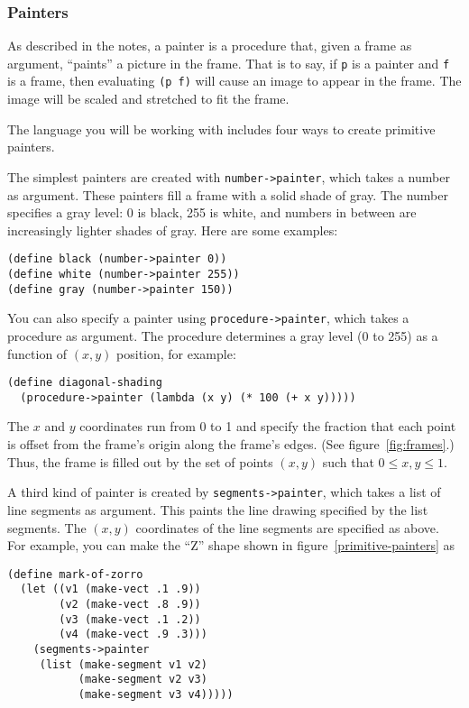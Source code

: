\subsubsection{Painters}

As described in the notes, a painter is a procedure that, given a frame
as argument, ``paints'' a picture in the frame.  That is to say, if
{\tt p} is a painter and {\tt f} is a frame, then evaluating {\tt (p
f)} will cause an image to appear in the frame.  The image will be
scaled and stretched to fit the frame.

The language you will be working with includes four ways to create
primitive painters.

The simplest painters are created with {\tt number->painter}, which
takes a number as argument.  These painters fill a frame with a solid
shade of gray.  The number specifies a gray level: 0 is black, 255 is
white, and numbers in between are increasingly lighter shades of
gray.  Here are some examples:

\begin{verbatim}
(define black (number->painter 0))
(define white (number->painter 255))
(define gray (number->painter 150))
\end{verbatim}

\noindent
You can also specify a painter using {\tt procedure->painter}, which
takes a procedure as argument.  The procedure determines a gray level
(0 to 255) as a function of $(x,y)$ position, for example:

\begin{verbatim}
(define diagonal-shading
  (procedure->painter (lambda (x y) (* 100 (+ x y)))))
\end{verbatim}

\noindent
The $x$ and $y$ coordinates run from 0 to 1 and specify the fraction
that each point is offset from the frame's origin along the frame's
edges.  (See figure~\ref{fig:frames}.) Thus, the frame is filled out by
the set of points $(x,y)$ such that $0\leq x,y \leq 1$.

A third kind of painter is created by {\tt segments->painter}, which
takes a list of line segments as argument.  This paints the line
drawing specified by the list segments.  The $(x,y)$ coordinates of
the line segments are specified as above.  For example, you can make
the ``Z'' shape shown in figure~\ref{primitive-painters} as

\begin{verbatim}
(define mark-of-zorro
  (let ((v1 (make-vect .1 .9))
        (v2 (make-vect .8 .9))
        (v3 (make-vect .1 .2))
        (v4 (make-vect .9 .3)))
    (segments->painter
     (list (make-segment v1 v2)
           (make-segment v2 v3)
           (make-segment v3 v4)))))
\end{verbatim}

